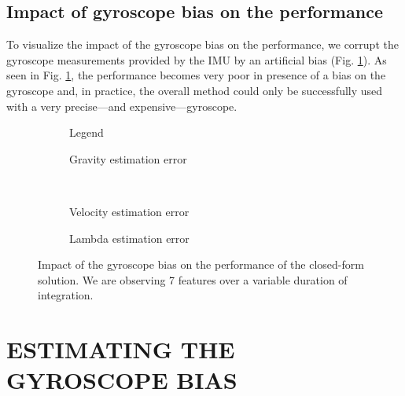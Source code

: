 \documentclass[letterpaper, 10 pt, conference]{ieeeconf}  %
\begin{document}
\subsection{Impact of gyroscope bias on the performance}
To visualize the impact of the gyroscope bias on the performance,
we corrupt the gyroscope measurements provided by the IMU by an artificial bias (Fig. \ref{fig:biasGyroCF}).
As seen in Fig. \ref{fig:biasGyroCF}, the performance becomes very poor in presence of a bias on the gyroscope and, in practice, the overall method could only be successfully used with a very precise---and expensive---gyroscope.


\begin{figure}
  \centering
        \hspace{0.2\columnwidth}%
        \begin{subfigure}[b]{0.3\columnwidth}
                \resizebox{\columnwidth}{!}{}
                \caption{Legend}

        \end{subfigure}%
        \begin{subfigure}[b]{0.5\columnwidth}
                \resizebox{\columnwidth}{!}{}
                \caption{Gravity estimation error}

        \end{subfigure}
        ~
        \begin{subfigure}[b]{0.5\columnwidth}
                \resizebox{\columnwidth}{!}{}
                \caption{Velocity estimation error}

        \end{subfigure}%
        \begin{subfigure}[b]{0.5\columnwidth}
                \resizebox{\columnwidth}{!}{}
                \caption{Lambda estimation error}

        \end{subfigure}
        \caption{Impact of the gyroscope bias on the performance of the closed-form solution. We are observing 7 features over a variable duration of integration. \label{fig:biasGyroCF}}
\end{figure}




\section{ESTIMATING THE GYROSCOPE BIAS}\label{SectionCalibration}
\end{document}
